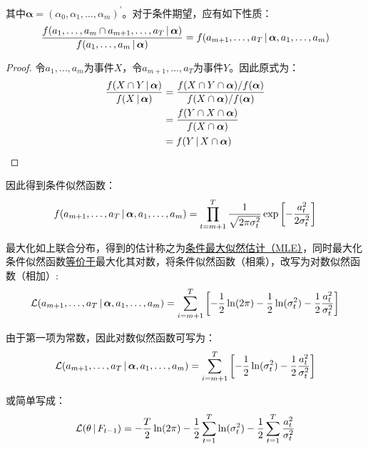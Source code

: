 \documentclass[11pt]{article}
\begin{document}
其中$\bm{\alpha} = (\alpha_0,\alpha_1,\dots,\alpha_m)^{'}$。对于条件期望，应有如下性质：
\begin{equation*}
    \frac{f (a_1,\dots,a_m \cap a_{m+1},\dots,a_T \,\vert\, \bm{\alpha})}{f(a_1,\dots,a_m \,\vert\, \bm{\alpha})}
    = f(a_{m+1},\dots,a_T \,\vert\, \bm{\alpha},a_1,\dots,a_m)
\end{equation*}

\begin{proof}
    令$a_1,\dots,a_m$为事件$X$，令$a_{m+1},\dots,a_T$为事件$Y$。因此原式为：
    \begin{align*}
        \frac{f( X \cap Y \,\vert\, \bm{\alpha})}{f(X \,\vert\, \bm{\alpha})} 
        &= \frac{f( X \cap Y \cap \bm{\alpha}) / f(\bm{\alpha}) }{f(X \cap \bm{\alpha}) / f(\bm{\alpha})} \\
        &= \frac{f( Y \cap X \cap \bm{\alpha})}{f(X \cap \bm{\alpha})} \\
        &= f(Y \,\vert\, X \cap \bm{\alpha})
    \end{align*}
\end{proof}

因此得到条件似然函数：
\begin{equation*}
    f(a_{m+1},\dots,a_T \,\vert\, \bm{\alpha},a_1,\dots,a_m) =
    \prod_{t=m+1}^{T} \frac{1}{\sqrt{2\pi\sigma_{t}^{2}}} \exp \left[ -\frac{a_{t}^{2}}{2\sigma_{t}^{2}} \right]
\end{equation*}

最大化如上联合分布，得到的估计称之为\uline{条件最大似然估计（MLE）}，同时最大化条件似然函数\uline{等价于}最大化其对数，将条件似然函数（相乘），改写为对数似然函数（相加）:
\begin{equation*}
    \mathcal{L}(a_{m+1},\dots,a_T \,\vert\, \bm{\alpha},a_1,\dots,a_m)
    = \sum_{i=m+1}^{T} \left[ -\frac{1}{2}\ln(2\pi) - \frac{1}{2} \ln(\sigma_{t}^{2}) - \frac{1}{2} \frac{a_{t}^{2}}{\sigma_{t}^{2}} \right]
\end{equation*}

由于第一项为常数，因此对数似然函数可写为：
\begin{equation*}
    \mathcal{L}(a_{m+1},\dots,a_T \,\vert\, \bm{\alpha},a_1,\dots,a_m) =
    \sum_{i=m+1}^{T} \left[ - \frac{1}{2} \ln(\sigma_{t}^{2}) - \frac{1}{2} \frac{a_{t}^{2}}{\sigma_{t}^{2}} \right]
\end{equation*}

或简单写成：
\begin{equation*}
    \mathcal{L}(\theta \,\vert\, F_{t-1})
    = -\frac{T}{2}\ln(2\pi) - \frac{1}{2} \sum_{t=1}^{T} \ln(\sigma_{t}^{2}) - \frac{1}{2} \sum_{t=1}^{T} \frac{a_{t}^{2}}{\sigma_{t}^{2}}
\end{equation*}
\end{document}
